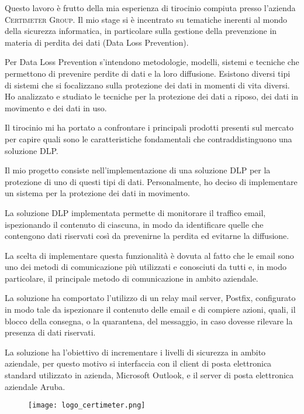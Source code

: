 
Questo lavoro è frutto della mia esperienza di tirocinio compiuta presso l’azienda \textsc{Certimeter Group}. Il mio stage si è incentrato su tematiche inerenti al mondo della sicurezza informatica, in particolare sulla gestione della prevenzione in materia di perdita dei dati (Data Loss Prevention).

Per Data Loss Prevention s’intendono metodologie, modelli, sistemi e tecniche che permettono di prevenire 
perdite di dati e la loro diffusione. Esistono diversi tipi di sistemi che si focalizzano sulla protezione 
dei dati in momenti di vita diversi. 
Ho analizzato e studiato le tecniche per la protezione dei dati a riposo, dei dati in movimento e dei dati in uso. 

Il tirocinio mi ha portato a confrontare i principali prodotti presenti sul mercato per capire quali sono 
le caratteristiche fondamentali che contraddistinguono una soluzione DLP.

Il mio progetto consiste nell’implementazione di una soluzione DLP per la protezione di uno di questi 
tipi di dati. Personalmente, ho deciso di implementare un sistema per la protezione dei dati in movimento.

La soluzione DLP implementata permette di monitorare il traffico email, ispezionando il contenuto di ciascuna, 
in modo da identificare quelle che contengono dati riservati così da prevenirne la perdita ed evitarne la diffusione.

La scelta di implementare questa funzionalità è dovuta al fatto che le email sono uno dei 
metodi di comunicazione più utilizzati e conosciuti da tutti e, in modo particolare, 
il principale metodo di comunicazione in ambito aziendale.

La soluzione ha comportato l’utilizzo di un relay mail server, Postfix, configurato in modo 
tale da ispezionare il contenuto delle email e di compiere azioni, quali, il blocco della consegna, 
o la quarantena, del messaggio, in caso dovesse rilevare la presenza di dati riservati.

La soluzione ha l’obiettivo di incrementare i livelli di sicurezza in ambito aziendale, 
per questo motivo si interfaccia con il client di posta elettronica standard utilizzato in azienda, 
Microsoft Outlook, e il server di posta elettronica aziendale Aruba.




\begin{figure}[b]
    \centering
    \texttt{[image: logo\_certimeter.png]}
\end{figure}